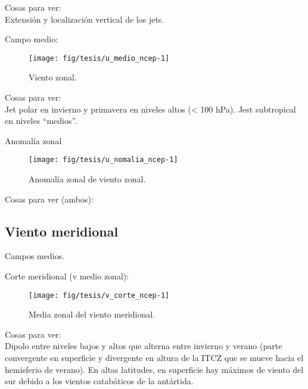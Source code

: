 \documentclass[es-AR,]{tufte-book}
\begin{document}
Cosas para ver:\\
Extensión y localización vertical de los jets.

Campo medio:

\begin{figure*}

{\centering \texttt{[image: fig/tesis/u\_medio\_ncep-1]} 

}

\caption[Viento zonal]{Viento zonal.}\label{fig:u_medio_ncep}
\end{figure*}

Cosas para ver:\\
Jet polar en invierno y primavera en niveles altos (\textless{} 100
hPa). Jest subtropical en niveles ``medios''.

Anomalía zonal

\begin{figure*}

{\centering \texttt{[image: fig/tesis/u\_nomalia\_ncep-1]} 

}

\caption[Anomalía zonal de viento zonal]{Anomalía zonal de viento zonal.}\label{fig:u_nomalia_ncep}
\end{figure*}

Cosas para ver (ambos):

\subsection{Viento meridional}\label{viento-meridional}

Campos medios.

Corte meridional (v medio zonal):

\begin{figure}

{\centering \texttt{[image: fig/tesis/v\_corte\_ncep-1]} 

}

\caption[Media zonal del viento meridional]{Media zonal del viento meridional.}\label{fig:v_corte_ncep}
\end{figure}

Cosas para ver:\\
Dipolo entre niveles bajos y altos que alterna entre invierno y verano
(parte convergente en superficie y divergente en altura de la ITCZ que
se mueve hacia el hemisferio de verano). En altas latitudes, en
superficie hay máximos de viento del sur debido a los vientos
catabáticos de la antártida.
\end{document}
